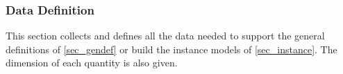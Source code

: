 \documentclass[12pt]{article}
\begin{document}

\subsubsection{Data Definition} \label{sec_datadef}

This section collects and defines all the data needed to support the general 
definitions of \ref{sec_gendef} or build the instance models of 
\ref{sec_instance}. The dimension of each quantity is also given.
~\newline

\end{document}
